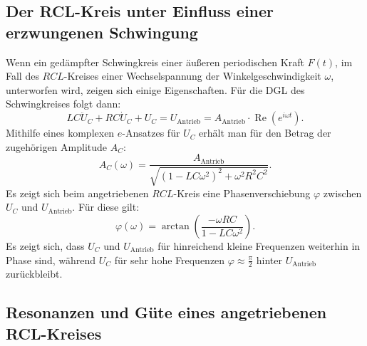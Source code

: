 \subsection{ Der RCL-Kreis unter Einfluss einer erzwungenen Schwingung}

Wenn ein gedämpfter Schwingkreis einer äußeren periodischen Kraft $F(t)$, im Fall des $RCL$-Kreises
 einer Wechselspannung der Winkelgeschwindigkeit $\omega$, unterworfen wird, zeigen sich einige Eigenschaften.
Für die DGL des Schwingkreises folgt dann:
\begin{equation}
  LC \ddot{U}_C + RC \dot{U}_C + U_C = U_{\text{Antrieb}} =A_{\text{Antrieb}} \cdot \operatorname{Re}\left( e^{i\omega t}\right)\text{.}
\end{equation}
Mithilfe eines komplexen $e$-Ansatzes für $U_C$ erhält man für den Betrag der zugehörigen Amplitude $A_C$:
\begin{equation}
  A_C(\omega) = \frac{A_{\text{Antrieb}}}{\sqrt{(1-LC\omega^2)^2 + \omega^2R^2C^2}}\text{.}
\end{equation}
Es zeigt sich beim angetriebenen $RCL$-Kreis eine Phasenverschiebung $\varphi$ zwischen $U_C$ und $U_{\text{Antrieb}}$.
Für diese gilt:
\begin{equation}
  \varphi(\omega) = \arctan\left( \frac{-\omega RC}{1-LC \omega^2}\right)\text{.}
\end{equation}
Es zeigt sich, dass $U_C$ und $U_{\text{Antrieb}}$ für hinreichend kleine Frequenzen weiterhin in Phase sind,
während $U_C$ für sehr hohe Frequenzen $\varphi \approx \frac{\pi}{2}$ hinter $U_{\text{Antrieb}}$ zurückbleibt.



\subsection{Resonanzen und Güte eines angetriebenen RCL-Kreises}

